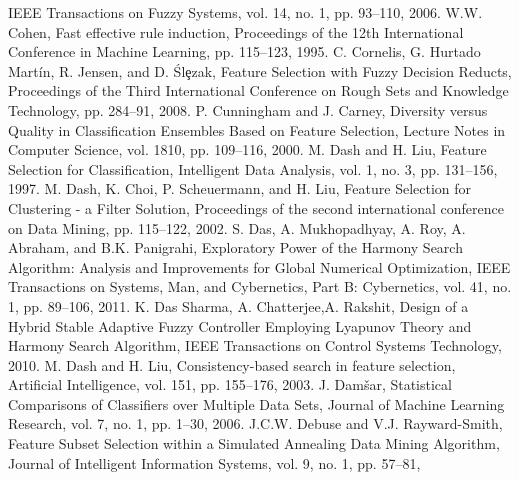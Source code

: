IEEE Transactions on Fuzzy Systems,
vol. 14, no. 1, pp. 93--110,
2006.
W.W. Cohen,
Fast effective rule induction,
Proceedings of the 12th International Conference in Machine Learning,
pp. 115--123,
1995.
C. Cornelis, G. Hurtado Mart\'{i}n, R. Jensen, and D. \'{S}l\c{e}zak,
Feature Selection with Fuzzy Decision Reducts,
Proceedings of the Third International Conference on Rough Sets and Knowledge Technology,
pp. 284--91,
2008.
P. Cunningham and J. Carney,
Diversity versus Quality in Classification Ensembles Based on Feature Selection,
Lecture Notes in Computer Science,
vol. 1810, pp. 109--116,
2000.
M. Dash and H. Liu,
Feature Selection for Classification,
Intelligent Data Analysis,
vol. 1, no. 3, pp. 131--156,
1997.
M. Dash, K. Choi, P. Scheuermann, and H. Liu,
Feature Selection for Clustering - a Filter Solution,
Proceedings of the second international conference on Data Mining,
pp. 115--122,
2002.
S. Das, A. Mukhopadhyay, A. Roy, A. Abraham, and B.K. Panigrahi,
Exploratory Power of the Harmony Search Algorithm: Analysis and Improvements for Global Numerical Optimization,
IEEE Transactions on Systems, Man, and Cybernetics, Part B: Cybernetics,
vol. 41, no. 1, pp. 89--106,
2011.
K. Das Sharma, A. Chatterjee,A. Rakshit,
Design of a Hybrid Stable Adaptive Fuzzy Controller Employing Lyapunov Theory and Harmony Search Algorithm,
IEEE Transactions on Control Systems Technology,
2010.
M. Dash and H. Liu,
Consistency-based search in feature selection,
Artificial Intelligence,
vol. 151, pp. 155--176,
2003.
J. Dam\v{s}ar,
Statistical Comparisons of Classifiers over Multiple Data Sets,
Journal of Machine Learning Research,
vol. 7, no. 1, pp. 1--30,
2006.
J.C.W. Debuse and V.J. Rayward-Smith,
Feature Subset Selection within a Simulated Annealing Data Mining Algorithm,
Journal of Intelligent Information Systems,
vol. 9, no. 1, pp. 57--81,
